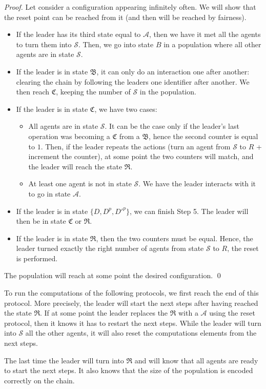 \documentclass[UKenglish]{llncs}
\newcommand\A{\mathcal{A}}
\newcommand\B{\mathfrak{B}}
\newcommand\C{\mathfrak{C}}
\newcommand\SSS{\mathcal{S}}
\newcommand\RL{\mathfrak{R}}
\begin{document}
\begin{proof}
Let consider a configuration appearing infinitely often.
We will show that the reset point can be reached from it
(and then will be reached by fairness).
\begin{itemize}
\item If the leader has its third state equal to $\A$, then we have it met all the agents to turn them
into $\SSS$. Then, we go into state $B$ in a
population where all other agents are in state $\SSS$.
\item If the leader is in state $\B$, it can only do an interaction one
after another: clearing the chain by following the leaders one identifier
after another.
We then
reach $\C$, keeping the number of $\SSS$ in the population.
\item If the leader is in state $\C$,
we have two cases:
\begin{itemize}
\item All agents are in state $\SSS$. It can be the case only if the leader's last
operation was becoming a $\C$ from a $\B$,
hence the second counter is equal to $1$. Then, if the leader repeats
the actions (turn an agent from $\SSS$ to $R$ + increment the counter),
at some point the two counters will match, and the leader will reach the state $\RL$.
\item At least one agent is not in state $\SSS$. We have the leader interacts with
it to go in state $\A$.
\end{itemize}
\item If the leader is in state $\{D,D^p,D'^p\}$, we can finish Step 5. The
leader will then be in state $\C$ or $\RL$.
\item If the leader is in state $\RL$, then the two counters must be equal.
Hence, the leader turned exactly the right number of agents from state $\SSS$ to $R$,
the reset is performed.
\end{itemize}
The population will reach at some point the desired configuration. \hfill \qed
 \end{proof}

To run the computations of the following protocols, we first reach the end
of this protocol. More precisely, the leader will start the next steps after
having reached the state $\RL$. If at some point the leader replaces
the $\RL$ with a $\A$ using the reset protocol, then it knows it has to restart
the next steps. While the leader will turn into $\SSS$ all the other agents,
it will also reset the computations elements from the next steps.

The last time the leader will turn into $\RL$ and  will know that all
agents are ready to start the next steps. It also knows that the size of the population
is encoded correctly on the chain.
\end{document}
